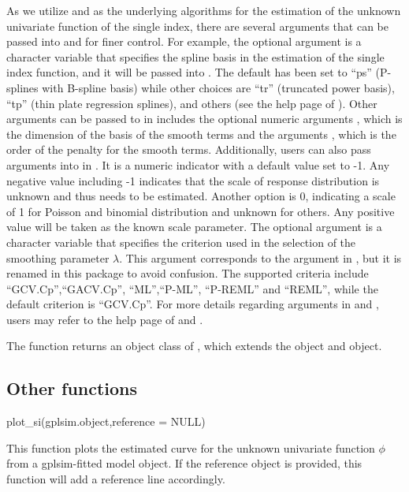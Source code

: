  As we utilize  and  as the underlying algorithms for the estimation of the unknown univariate function of the single index, there are several arguments that can be passed into  and  for finer control. For example, the optional argument  is a character variable that specifies the spline basis in the estimation of the single index function, and it will be passed into . The default has been set to ``ps'' (P-splines with B-spline basis) while other choices are ``tr'' (truncated power basis), ``tp'' (thin plate regression splines), and others (see the help page of ). Other  arguments can be passed to  in  includes the optional numeric arguments , which is the dimension of the basis of the smooth terms and the arguments , which is the order of the penalty for the smooth terms. Additionally, users can also pass arguments  into  in . It is a numeric indicator with a default value set to -1. Any negative value including -1 indicates that the scale of response distribution is unknown and thus needs to be estimated. Another option is 0, indicating a scale of 1 for Poisson and binomial distribution and unknown for others. Any positive value will be taken as the known scale parameter. The optional argument  is a character variable that specifies the criterion used in the selection of the smoothing parameter $\lambda$. This argument corresponds to the argument  in , but it is renamed in this package to avoid confusion. The supported criteria include ``GCV.Cp'',``GACV.Cp'', ``ML'',``P-ML'', ``P-REML'' and ``REML'', while the default criterion is ``GCV.Cp''. For more details regarding arguments in  and , users may refer to the help page of  and .

The function  returns an object class of , which extends the  object and  object.

\subsection{Other functions}

\begin{example}
  plot_si(gplsim.object,reference = NULL)
\end{example}
This function plots the estimated curve for the unknown univariate function $\phi$ from a gplsim-fitted model object. If the reference object is provided, this function will add a reference line accordingly. 


